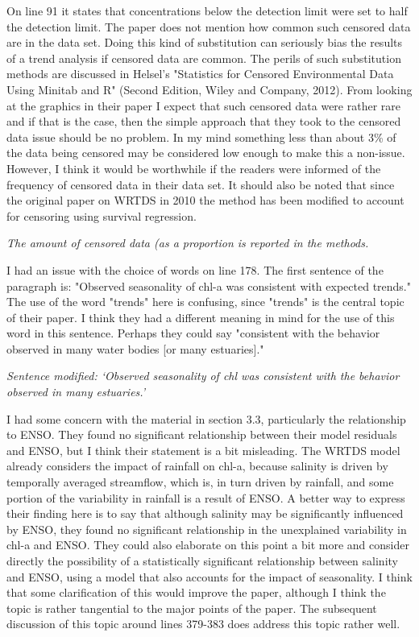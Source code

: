 \documentclass[letterpaper,12pt,oneside]{article}\usepackage[]{graphicx}\usepackage[]{color}
\begin{document}
On line 91 it states that concentrations below the detection limit were set to half the detection limit.  The paper does not mention how common such censored data are in the data set.  Doing this kind of substitution can seriously bias the results of a trend analysis if censored data are common.  The perils of such substitution methods are discussed in Helsel's "Statistics for Censored Environmental Data Using Minitab and R" (Second Edition, Wiley and Company, 2012).  From looking at the graphics in their paper I expect that such censored data were rather rare and if that is the case, then the simple approach that they took to the censored data issue should be no problem.  In my mind something less than about 3\% of the data being censored may be considered low enough to make this a non-issue.  However, I think it would be worthwhile if the readers were informed of the frequency of censored data in their data set.  It should also be noted that since the original paper on WRTDS in 2010 the method has been modified to account for censoring using survival regression.  

{\it The amount of censored data (as a proportion is reported in the methods.}

I had an issue with the choice of words on line 178.  The first sentence of the paragraph is: "Observed seasonality of chl-a was consistent with expected trends."  The use of the word "trends" here is confusing, since "trends" is the central topic of their paper.  I think they had a different meaning in mind for the use of this word in this sentence.  Perhaps they could say "consistent with the behavior observed in many water bodies [or many estuaries]."  

{\it Sentence modified: `Observed seasonality of \acs{chl} was consistent with the behavior observed in many estuaries.'}

I had some concern with the material in section 3.3, particularly the relationship to ENSO.  They found no significant relationship between their model residuals and ENSO, but I think their statement is a bit misleading.  The WRTDS model already considers the impact of rainfall on chl-a, because salinity is driven by temporally averaged streamflow, which is, in turn driven by rainfall, and some portion of the variability in rainfall is a result of ENSO.  A better way to express their finding here is to say that although salinity may be significantly influenced by ENSO, they found no significant relationship in the unexplained variability in chl-a and ENSO.  They could also elaborate on this point a bit more and consider directly the possibility of a statistically significant relationship between salinity and ENSO, using a model that also accounts for the impact of seasonality.  I think that some clarification of this would improve the paper, although I think the topic is rather tangential to the major points of the paper.  The subsequent discussion of this topic around lines 379-383 does address this topic rather well.
\end{document}
